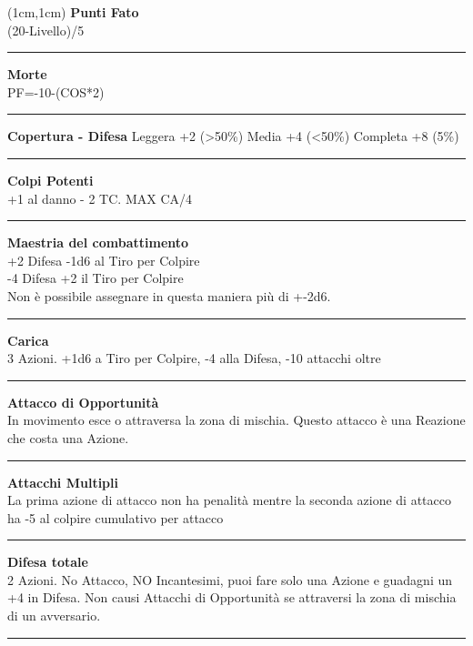\documentclass[a4paper,12 pt,openany]{book}
\newcommand{\riga}{\rule{\textwidth}{0.4pt}}
\begin{document}
\begin{textblock*}{4cm}(1cm,1cm) %
{\textbf{Punti Fato}\\
(20-Livello)/5}

\riga

{\textbf{Morte}\\
PF=-10-(COS*2)}

\riga

\textbf{Copertura - Difesa}
Leggera +2 (>50\%)
Media +4 (<50\%)
Completa +8 (5\%)

\riga

\textbf{Colpi Potenti}\\
+1 al danno - 2 TC. MAX CA/4

\riga

\textbf{Maestria del combattimento}\\
+2 Difesa -1d6 al Tiro per Colpire\\
-4 Difesa +2 il Tiro per Colpire \\
Non è possibile assegnare in questa maniera più di +-2d6.

\riga

\textbf{Carica}\\
3 Azioni. +1d6 a Tiro per Colpire, -4 alla Difesa, -10 attacchi oltre

\riga

\textbf{Attacco di Opportunità}\\
In movimento esce o attraversa la zona di mischia. Questo attacco è una Reazione che costa una Azione.

\riga

\textbf{Attacchi Multipli}\\
La prima azione di attacco non ha penalità mentre la seconda azione di attacco ha -5 al colpire cumulativo per attacco

\riga

\textbf{Difesa totale}\\
2 Azioni. No Attacco, NO Incantesimi, puoi fare solo una Azione e guadagni un +4 in Difesa. Non causi Attacchi di Opportunità se attraversi la zona di mischia di un avversario.

\riga


\end{textblock*}
\end{document}
